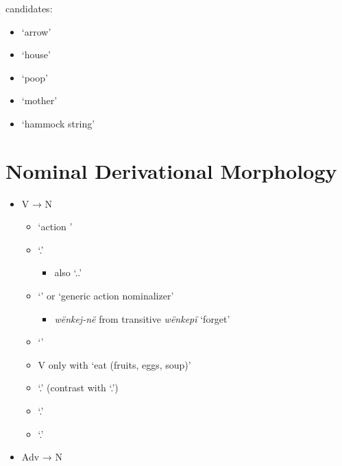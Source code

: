 \documentclass{memoir}
\begin{document}
candidates:

\begin{itemize}
\tightlist
\item
  `arrow'
\item
  `house'
\item
  `poop'
\item
  `mother'
\item
  `hammock string'
\end{itemize}

\section{\texorpdfstring{Nominal Derivational Morphology
\label{sec:nounderiv}}{Nominal Derivational Morphology }}

\begin{itemize}
\tightlist
\item
  V → N

  \begin{itemize}
  \tightlist
  \item
     `action ' 
  \item
     `.'

    \begin{itemize}
    \tightlist
    \item
      also `..' 
    \end{itemize}
  \item
     `' or `generic action nominalizer'

    \begin{itemize}
    \tightlist
    \item
      \emph{wënkej-në} from transitive \emph{wënkepï} `forget'
    \end{itemize}
  \item
     `'
  \item
    V only with  `eat (fruits, eggs, soup)'
  \item
     `.' (contrast with 
    `.')
  \item
     `.'
  \item
     `.'
  \end{itemize}
\item
  Adv → N


\end{itemize}
\end{document}
